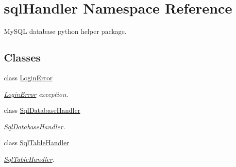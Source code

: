 \hypertarget{namespacesql_handler}{}\section{sql\+Handler Namespace Reference}
\label{namespacesql_handler}


My\+S\+QL database python helper package.  


\subsection*{Classes}
\begin{DoxyCompactItemize}
\item 
class \mbox{\hyperlink{classsql_handler_1_1_login_error}{Login\+Error}}
\begin{DoxyCompactList}\small\item\em \mbox{\hyperlink{classsql_handler_1_1_login_error}{Login\+Error}} exception. \end{DoxyCompactList}\item 
class \mbox{\hyperlink{classsql_handler_1_1_sql_database_handler}{Sql\+Database\+Handler}}
\begin{DoxyCompactList}\small\item\em \mbox{\hyperlink{classsql_handler_1_1_sql_database_handler}{Sql\+Database\+Handler}}. \end{DoxyCompactList}\item 
class \mbox{\hyperlink{classsql_handler_1_1_sql_table_handler}{Sql\+Table\+Handler}}
\begin{DoxyCompactList}\small\item\em \mbox{\hyperlink{classsql_handler_1_1_sql_table_handler}{Sql\+Table\+Handler}}. \end{DoxyCompactList}\end{DoxyCompactItemize}
